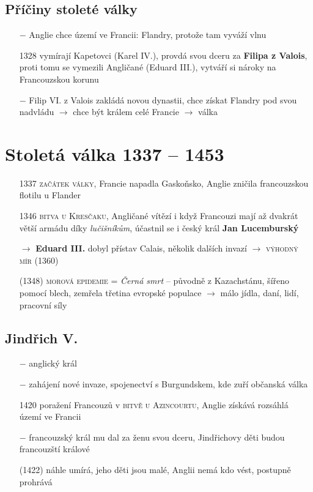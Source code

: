 \documentclass{article}
\begin{document}
\subsection*{Příčiny stoleté války}
\begin{itemize}
    \vspace{-0.5em}
    \setlength\itemsep{0.15em}
    \item[$-$] Anglie chce území ve Francii: Flandry, protože tam vyváží vlnu
    \item[1328] vymírají Kapetovci (Karel IV.), provdá svou dceru za \textbf{Filipa z Valois}, proti tomu se vymezili Angličané (Eduard III.), vytváří si nároky na Francouzskou korunu
    \item[$-$] Filip VI. z Valois zakládá novou dynastii, chce získat Flandry pod svou nadvládu $\rightarrow$ chce být králem celé Francie $\rightarrow$ válka
\end{itemize}


\section*{Stoletá válka 1337 -- 1453}
\begin{itemize}
    \vspace{-0.5em}
    \setlength\itemsep{0.15em}
    \item[1337] \textsc{začátek války}, Francie napadla Gaskoňsko, Anglie zničila francouzskou flotilu u Flander
    \item[1346] \textsc{bitva u Kresčaku}, Angličané vítězí i když Francouzi mají až dvakrát větší armádu díky \textit{lučišníkům}, účastnil se i český král \textbf{Jan Lucemburský}
    \item[$\rightarrow$] \textbf{Eduard III.} dobyl přístav Calais, několik dalších invazí $\rightarrow$ \textsc{výhodný mír} (1360)
    \item[(1348)] \textsc{morová epidemie} = \textit{Černá smrt}  -- původně z Kazachstánu, šířeno pomocí blech, zemřela třetina evropské populace $\rightarrow$ málo jídla, daní, lidí, pracovní síly
\end{itemize}

\subsection*{Jindřich V.}
\begin{itemize}
    \vspace{-0.5em}
    \setlength\itemsep{0.15em}
    \item[$-$] anglický král
    \item[$-$] zahájení nové invaze, spojenectví s Burgundskem, kde zuří občanská válka
    \item[1420] poražení Francouzů v \textsc{bitvě u Azincourtu}, Anglie získává rozsáhlá území ve Francii
    \item[$-$] francouzský král mu dal za ženu svou dceru, Jindřichovy děti budou francouzští králové
    \item[(1422)] náhle umírá, jeho děti jsou malé, Anglii nemá kdo vést, postupně prohrává
\end{itemize}
\end{document}
